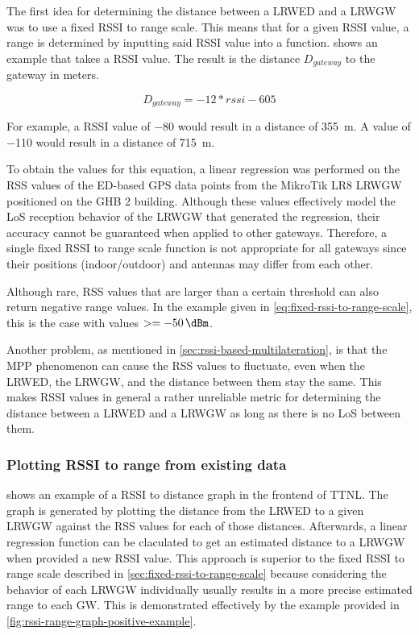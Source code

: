 The first idea for determining the distance between a \acl{LRWED} and a \acl{LRWGW} was to use a fixed \ac{RSSI} to range scale.
This means that for a given \ac{RSSI} value, a range is determined by inputting said \ac{RSSI} value into a function.
 shows an example that takes a \ac{RSSI} value.
The result is the distance $D_{gateway}$ to the gateway in meters.

\begin{equation}\label{eq:fixed-rssi-to-range-scale}
    D_{gateway} = -12 * rssi - 605
\end{equation}

For example, a \ac{RSSI} value of \SI{-80}{\dBm} would result in a distance of \SI{355}{\meter}.
A value of \SI{-110}{\dBm} would result in a distance of \SI{715}{\meter}.

To obtain the values for this equation, a linear regression was performed on the \ac{RSS} values of the \acl{ED}-based GPS data points from the MikroTik LR8 \acl{LRWGW} positioned on the \ac{GHB} 2 building.
Although these values effectively model the \ac{LoS} reception behavior of the \acl{LRWGW} that generated the regression, their accuracy cannot be guaranteed when applied to other gateways.
Therefore, a single fixed \ac{RSSI} to range scale function is not appropriate for all gateways since their positions (indoor/outdoor) and antennas may differ from each other.

Although rare, \ac{RSS} values that are larger than a certain threshold can also return negative range values.
In the example given in \cref{eq:fixed-rssi-to-range-scale}, this is the case with values $>=\SI{-50}{\dBm}$.

Another problem, as mentioned in \cref{sec:rssi-based-multilateration}, is that the \ac{MPP} phenomenon can cause the \ac{RSS} values to fluctuate, even when the \acl{LRWED}, the \acl{LRWGW}, and the distance between them stay the same.
This makes RSSI values in general a rather unreliable metric for determining the distance between a \acl{LRWED} and a \acl{LRWGW} as long as there is no \ac{LoS} between them.

\subsubsection{Plotting \acs{RSSI} to range from existing data}\label{sec:plotting-rssi-to-range-from-existing-data}

 shows an example of a \ac{RSSI} to distance graph in the frontend of \ac{TTNL}.
The graph is generated by plotting the distance from the \acl{LRWED} to a given \acl{LRWGW} against the \ac{RSS} values for each of those distances.
Afterwards, a linear regression function can be claculated to get an estimated distance to a \acl{LRWGW} when provided a new \ac{RSSI} value.
This approach is superior to the fixed \ac{RSSI} to range scale described in \cref{sec:fixed-rssi-to-range-scale} because considering the behavior of each \acl{LRWGW} individually usually results in a more precise estimated range to each \acl{GW}.
This is demonstrated effectively by the example provided in \cref{fig:rssi-range-graph-positive-example}.

